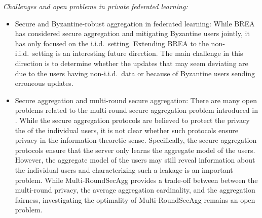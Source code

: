 \documentclass[12pt,draftcls,onecolumn]{IEEEtran}
\begin{document}
\emph{Challenges and open problems in private federated learning:}
\begin{itemize}
\item Secure and Byzantine-robust aggregation in federated learning: While BREA \cite{so2020byzantine} has considered secure aggregation and mitigating Byzantine users jointly, it has only focused on the i.i.d.~setting. Extending BREA to the non-i.i.d.~setting is an interesting future direction. The main challenge in this direction is to determine whether the updates that may seem deviating are due to the users having non-i.i.d.~data or because of Byzantine users sending erroneous updates. 
\item Secure aggregation and multi-round secure aggregation: 
There are many open problems related to the multi-round secure aggregation problem introduced in \cite{so2021securing}. While the secure aggregation protocols are believed to protect the privacy the of the individual users, it is not clear whether such protocols ensure privacy in the information-theoretic sense. Specifically, the secure aggregation protocols ensure that the server only learns the aggregate model of the users. However, the aggregate model of the users may still reveal information about the individual users and characterizing such a leakage is an important problem. While Multi-RoundSecAgg provides a trade-off between between the multi-round privacy, the average aggregation cardinality, and the aggregation fairness, investigating the optimality of Multi-RoundSecAgg remains an open problem.  
\end{itemize}


%

\end{document}
